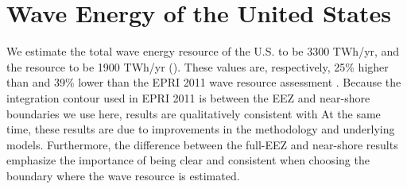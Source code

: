\section{\DIFdelbegin {}\DIFdelend Wave Energy \DIFdelbegin {}\DIFdelend \DIFaddbegin {}\DIFaddend of the United States}
\label{sec:results}

We estimate the total wave energy resource of the U.S. \DIFdelbegin {}\DIFdelend to be 3300 TWh/yr, and the \DIFdelbegin {}\DIFdelend \DIFaddbegin {}\DIFaddend resource to be 1900 TWh/yr (\DIFdelbegin {}\DIFdelend \DIFaddbegin {}\DIFaddend ). 
These values are, respectively, 25\% higher than and 39\% lower than \DIFdelbegin {}\DIFdelend the EPRI 2011 wave resource assessment \citep[][]{EPRIwaveresource2011}. 
Because the integration contour used in EPRI 2011 is between the EEZ and near-shore boundaries we use here, \DIFdelbegin {}\DIFdelend \DIFaddbegin {}\DIFaddend results are qualitatively consistent with \DIFdelbegin {}\DIFdelend \DIFaddbegin {}\DIFaddend At the same time, these results are \DIFdelbegin {}\DIFdelend \DIFaddbegin {}\DIFaddend due to improvements in the methodology and underlying models\DIFdelbegin {}\DIFdelend . Furthermore, the difference between the full-EEZ and near-shore results emphasize the importance of being clear and consistent when choosing the boundary where the wave resource is estimated.

